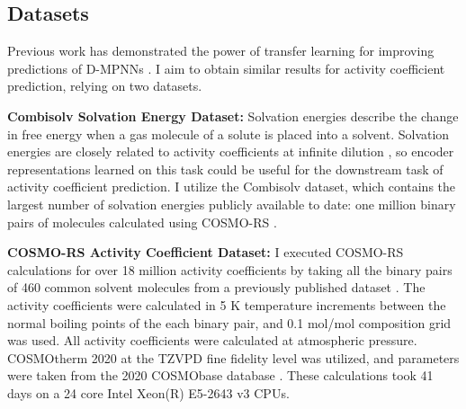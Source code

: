 



\subsection{Datasets}

Previous work has demonstrated the power of transfer learning for improving predictions of D-MPNNs \cite{Vermeire2021}. I aim to obtain similar results for activity coefficient prediction, relying on two datasets.

\noindent
\textbf{Combisolv Solvation Energy Dataset:} Solvation energies describe the change in free energy when a gas molecule of a solute is placed into a solvent. Solvation energies are closely related to activity coefficients at infinite dilution \cite{Moine2017}, so encoder representations learned on this task could be useful for the downstream task of activity coefficient prediction. I utilize the Combisolv dataset, which contains the largest number of solvation energies publicly available to date: one million binary pairs of molecules calculated using COSMO-RS \cite{Vermeire2021}.

\noindent
\textbf{COSMO-RS Activity Coefficient Dataset:} I executed COSMO-RS calculations for over 18 million activity coefficients by taking all the binary pairs of 460 common solvent molecules from a previously published dataset \cite{Amar2019}. The activity coefficients were calculated in 5 K temperature increments between the normal boiling points of the each binary pair, and 0.1 mol/mol composition grid was used. All activity coefficients were calculated at atmospheric pressure. COSMOtherm 2020 at the TZVPD fine fidelity level was utilized, and parameters were taken from the 2020 COSMObase database \cite{Klamt2010}. These calculations took 41 days on a 24 core Intel Xeon(R) E5-2643 v3 CPUs. 

